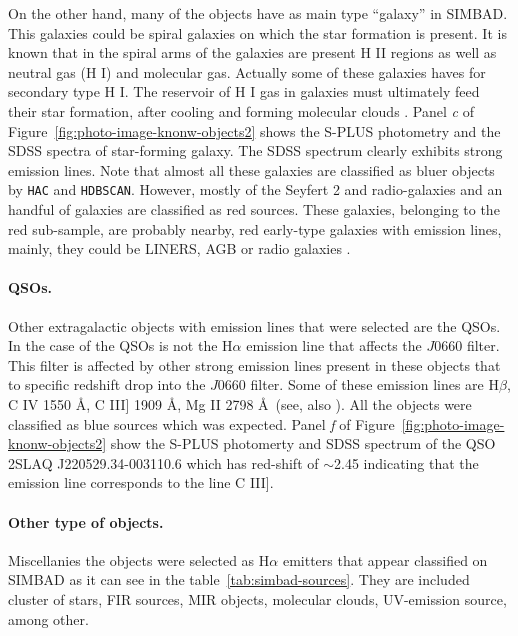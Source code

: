 \documentclass[fleqn,usenatbib]{mnras}
\begin{document}
On the other hand, many of the objects have as main type ``galaxy'' in SIMBAD.
This galaxies could be spiral galaxies on which the star formation is present. 
It is known that in the spiral arms of the galaxies are present H II regions 
as well as neutral gas (H I) and molecular gas. Actually some of these galaxies 
haves for secondary type H I. The reservoir of H I gas in galaxies must ultimately
feed their star formation, after cooling and forming molecular
clouds \citep{van-Driel:2016}. Panel \textit{c} of Figure~\ref{fig:photo-image-knonw-objects2} shows the 
S-PLUS photometry and the SDSS spectra of star-forming galaxy. The SDSS spectrum 
clearly exhibits strong emission lines. Note that almost all these galaxies are 
classified as bluer objects
by \texttt{HAC} and \texttt{HDBSCAN}.
However, mostly of the Seyfert 2 and radio-galaxies and an handful of 
galaxies are classified as red sources. 
These galaxies, belonging to the red sub-sample, are probably nearby, red early-type galaxies with emission lines, mainly, they could be LINERS, AGB or radio galaxies \citep{Capetti:2011}.

\paragraph{QSOs.}

Other extragalactic objects with emission lines that were selected are the
QSOs. In the case of the QSOs is not the H{$\alpha$} emission line that affects
 the $J$0660 filter. This filter is affected by other strong emission lines present in
these objects that to specific redshift drop into the $J$0660 filter.
Some of these emission lines are H{$\beta$}, C {\sc IV} 1550 \AA, C {\sc III]} 1909 \AA,
  Mg {\sc II} 2798 \AA~(see, also \citealp{Gutierrez:2020, Nakazono:2021}).
  All the objects were classified as blue sources which was expected. Panel \textit{f} of
  Figure~\ref{fig:photo-image-knonw-objects2} show the S-PLUS photomerty and SDSS 
  spectrum of the QSO 2SLAQ J220529.34-003110.6
  which has red-shift of $\sim$2.45 indicating that the emission line corresponds to
  the line C {\sc III]}.
  
\paragraph{Other type of objects.}
  
  Miscellanies the objects were selected as H{$\alpha$} emitters that appear classified on
  SIMBAD as it can see in the table~\ref{tab:simbad-sources}. They are included cluster of stars,
  FIR sources, MIR objects, molecular clouds, UV-emission source,  among other.
\end{document}
